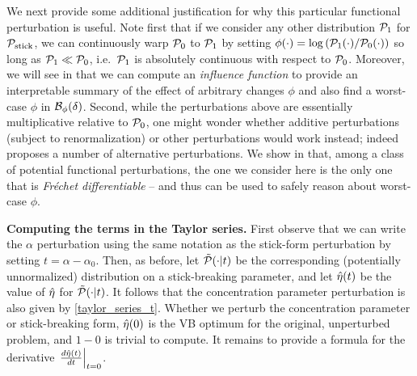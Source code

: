 We next provide some additional justification for why this particular functional
perturbation is useful. Note first that if we consider any other distribution
$\mathcal{P}_{1}$ for $\mathcal{P}_{\mathrm{stick}}$, we can continuously warp $\mathcal{P}_{0}$ to $\mathcal{P}_{1}$ by setting
$\phi(\cdot) = \log \left( \mathcal{P}_{1}(\cdot) / \mathcal{P}_{0}(\cdot) \right)$ so long as
$\mathcal{P}_{1} \ll \mathcal{P}_{0}$, i.e.\ $\mathcal{P}_{1}$ is absolutely continuous with respect to
$\mathcal{P}_{0}$. Moreover, we will see in  that we can
compute an \emph{influence function} to provide an interpretable summary of the
effect of arbitrary changes $\phi$ and also find a worst-case $\phi$ in
$\mathcal{B}_\phi(\delta)$. Second, while the perturbations above are essentially
multiplicative relative to $\mathcal{P}_{0}$, one might wonder whether additive
perturbations (subject to renormalization) or other perturbations would work
instead; indeed \citet{gustafson:1996:local} proposes a number of alternative
perturbations. We show in  that, among a class of
potential functional perturbations, the one we consider here is the only one
that is {\em Fr{\'e}chet differentiable} -- and thus can be used to safely
reason about worst-case $\phi$.

\noindent \textbf{Computing the terms in the Taylor series.} First observe that
we can write the $\alpha$ perturbation using the same notation as the stick-form
perturbation by setting $t = \alpha - \alpha_0$. Then, as before, let
$\tilde{\mathcal{P}}(\cdot \vert t)$ be the corresponding (potentially unnormalized)
distribution on a stick-breaking parameter, and let $\hat\eta(t)$ be the value of
$\hat\eta$ for $\tilde{\mathcal{P}}(\cdot \vert t)$. It follows that the concentration
parameter perturbation is also given by \eqref{taylor_series_t}. Whether we
perturb the concentration parameter or stick-breaking form, $\hat\eta(0)$ is the
VB optimum for the original, unperturbed problem, and $1-0$ is trivial to
compute. It remains to provide a formula for the derivative
$\left.\frac{d\hat\eta(t)}{dt}\right\vert_{t=0}$.
%


